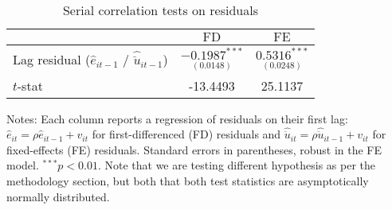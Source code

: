 \begin{table}[H]
\centering
\caption{Serial correlation tests on residuals}
\label{tab:autocorr_tests}
\begin{tabular}{lcc}
\hline
 & $\text{FD}$ & $\text{FE}$ \\
\hline
Lag residual ($\hat{e}_{it-1}$ / $\hat{\ddot{u}}_{it-1}$)
  & $\underset{(0.0148)}{-0.1987^{***}}$
  & $\underset{(0.0248)}{0.5316^{***}}$ \\
$t$-stat & -13.4493 & 25.1137 \\
\hline
\end{tabular}

\begin{flushleft}\footnotesize
Notes: Each column reports a regression of residuals on their first lag:
$\hat{e}_{it}=\rho \hat{e}_{it-1}+v_{it}$ for first-differenced (FD) residuals and
$\hat{\ddot{u}}_{it}=\rho \hat{\ddot{u}}_{it-1}+v_{it}$ for fixed-effects (FE) residuals.
Standard errors in parentheses, robust in the FE model. ${}^{***}p<0.01$. Note that we are testing different hypothesis as per the methodology section, but both that both test statistics are asymptotically normally distributed.
\end{flushleft}
\end{table}
